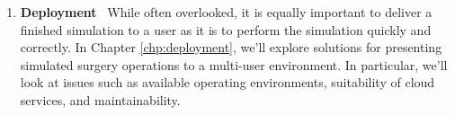 \begin{enumerate}
    \item \textbf{Deployment}~ While often overlooked, it is equally
      important to deliver a finished simulation to a user as it is to
      perform the simulation quickly and correctly. In Chapter
      \ref{chp:deployment}, we'll explore solutions for presenting
      simulated surgery operations to a multi-user environment. In
      particular, we'll look at issues such as available operating
      environments, suitability of cloud services, and maintainability.
    
  \end{enumerate}

  
  
